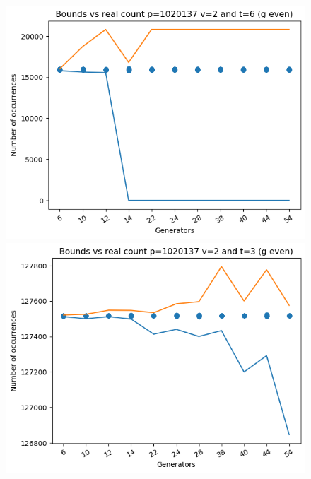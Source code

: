 \documentclass{article}
\begin{document}
\begin{figure}[H]
\begin{minipage}{.49\textwidth}
            \includegraphics[width=\textwidth]{../plots/tuples_figures/1020137v2geven/test_p1020137_v2_t6_g_even.png}
    \end{minipage}
    \begin{minipage}{.49\textwidth}
            \centering
            \includegraphics[width=\textwidth]{../plots/tuples_figures/1020137v2geven/test_p1020137_v2_t3_g_even.png}

\end{minipage}
\end{figure}
\end{document}
